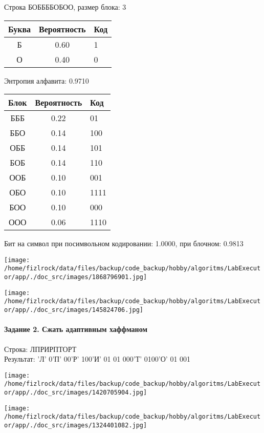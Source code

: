 \documentclass[a4paper, 12pt]{article}
\begin{document}
Строка БОББББОБОО, размер блока: 3
\begin{center}
 \begin{tabular}{ |c|c|l| } 
  \hline
     Буква & Вероятность & Код\\ \hline
Б & 0.60 & 1\\\hline
О & 0.40 & 0
\\ \hline \end{tabular}
\end{center}
Энтропия алфавита: 0.9710
\begin{center}
 \begin{tabular}{ |c|c|l| } 
  \hline
     Блок & Вероятность & Код\\ \hline
БББ & 0.22 & 01\\\hline
ББО & 0.14 & 100\\\hline
ОББ & 0.14 & 101\\\hline
БОБ & 0.14 & 110\\\hline
ООБ & 0.10 & 001\\\hline
ОБО & 0.10 & 1111\\\hline
БОО & 0.10 & 000\\\hline
ООО & 0.06 & 1110
\\ \hline \end{tabular}
\end{center}
Бит на символ при посимвольном кодировании: 1.0000, при блочном: 0.9813

\texttt{[image: /home/fizlrock/data/files/backup/code\_backup/hobby/algoritms/LabExecutor/app/./doc\_src/images/1868796901.jpg]}

\texttt{[image: /home/fizlrock/data/files/backup/code\_backup/hobby/algoritms/LabExecutor/app/./doc\_src/images/145824706.jpg]}
\pagebreak
\paragraph{Задание 2. Сжать адаптивным хаффманом\\}

Строка: 
ЛПРИРПТОРТ\\
Результат: 'Л' 0'П' 00'Р' 100'И' 01 01 000'Т' 0100'О' 01 001

\texttt{[image: /home/fizlrock/data/files/backup/code\_backup/hobby/algoritms/LabExecutor/app/./doc\_src/images/1420705904.jpg]}

\texttt{[image: /home/fizlrock/data/files/backup/code\_backup/hobby/algoritms/LabExecutor/app/./doc\_src/images/1324401082.jpg]}
\end{document}
